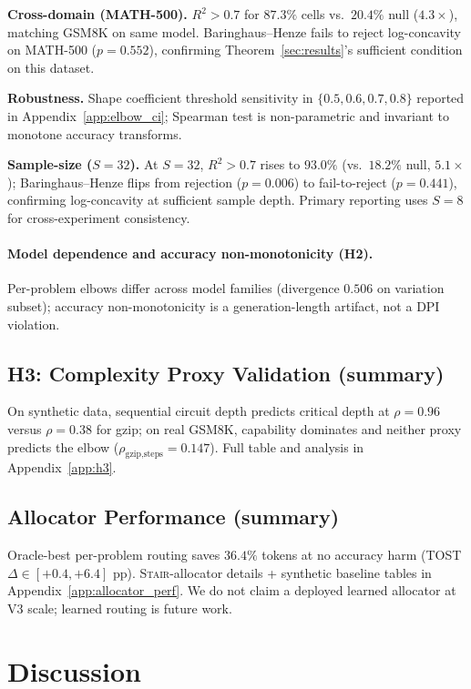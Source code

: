\documentclass{article}
\newcommand{\method}{\textsc{Stair}}
\begin{document}
\textbf{Cross-domain (MATH-500).}  $R^2 > 0.7$ for $\bm{87.3\%}$ cells vs.\ $\bm{20.4\%}$ null ($4.3\times$), matching GSM8K on same model.  Baringhaus--Henze fails to reject log-concavity on MATH-500 ($p=0.552$), confirming Theorem~\ref{sec:results}'s sufficient condition on this dataset.

\textbf{Robustness.}  Shape coefficient threshold sensitivity in $\{0.5,0.6,0.7,0.8\}$ reported in Appendix~\ref{app:elbow_ci}; Spearman test is non-parametric and invariant to monotone accuracy transforms.

\textbf{Sample-size ($S{=}32$).}  At $S{=}32$, $R^2 > 0.7$ rises to $\bm{93.0\%}$ (vs.\ $18.2\%$ null, $5.1\times$); Baringhaus--Henze flips from rejection ($p=0.006$) to fail-to-reject ($p=0.441$), confirming log-concavity at sufficient sample depth.  Primary reporting uses $S{=}8$ for cross-experiment consistency.

\paragraph{Model dependence and accuracy non-monotonicity (H2).}  Per-problem elbows differ across model families (divergence $0.506$ on variation subset); accuracy non-monotonicity is a generation-length artifact, not a DPI violation.
\label{sec:h2}
\subsection{H3: Complexity Proxy Validation (summary)}
On synthetic data, sequential circuit depth predicts critical depth at $\rho=0.96$ versus $\rho=0.38$ for gzip; on real GSM8K, capability dominates and neither proxy predicts the elbow ($\rho_{\text{gzip,steps}}=0.147$). Full table and analysis in Appendix~\ref{app:h3}.

\subsection{Allocator Performance (summary)}
Oracle-best per-problem routing saves $36.4\%$ tokens at no accuracy harm (TOST $\Delta\in[+0.4,+6.4]$ pp). \method{}-allocator details + synthetic baseline tables in Appendix~\ref{app:allocator_perf}. We do not claim a deployed learned allocator at V3 scale; learned routing is future work.

\section{Discussion}
\label{sec:discussion}
\end{document}

